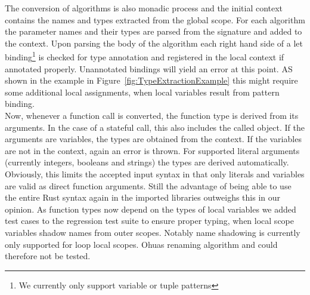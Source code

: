 The conversion of algorithms is also monadic process and the initial context contains the names and types extracted from the global scope. For each algorithm the parameter names and their types are parsed from the signature and added to the context. Upon parsing the body of the algorithm each right hand side of a let binding\footnote{We currently only support variable or tuple patterns} is checked for type annotation and registered in the local context if annotated properly. Unannotated bindings will yield an error at this point. AS shown in the example in Figure~\ref{fig:TypeExtractionExample} this might require some additional local assignments, when local variables result from pattern binding.\\

Now, whenever a function call is converted, the function type is derived from its arguments. In the case of a stateful call, this also includes the called object. If the arguments are variables, the types are obtained from the context. If the variables are not in the context, again an error is thrown. For supported literal arguments (currently integers, booleans and strings) the types are derived automatically. Obviously, this limits the accepted input syntax in that only literals and variables are valid as direct function arguments. Still the advantage of being able to use the entire Rust syntax again in the imported libraries outweighs this in our opinion. As function types now depend on the types of local variables we added test cases to the regression test suite to ensure proper typing, when local scope variables shadow names from outer scopes. Notably name shadowing is currently only supported for loop local scopes.  Ohuas renaming algorithm and could therefore not be tested.\\


